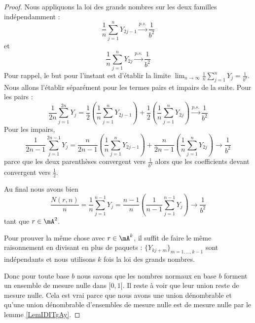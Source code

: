\begin{proof}
    Nous appliquons la loi des grands nombres sur les deux familles indépendamment :
    \begin{equation}
        \frac{1}{ n }\sum_{j=1}^nY_{2j-1}\stackrel{p.s.}{\longrightarrow}\frac{1}{ b^2 }
    \end{equation}
    et 
    \begin{equation}
        \frac{1}{ n }\sum_{j=1}^nY_{2j}\stackrel{p.s.}{\longrightarrow}\frac{1}{ b^2 }
    \end{equation}
    Pour rappel, le but pour l'instant est d'établir la limite \( \lim_{n\to \infty} \frac{1}{ n }\sum_{j=1}^nY_j=\frac{1}{ b^2 }\). Nous allons l'établir séparément pour les termes pairs et impairs de la suite. Pour les pairs :
    \begin{equation}
        \frac{1}{ 2n }\sum_{j=1}^{2n}Y_j=\frac{ 1 }{2}\left( \frac{1}{ n }\sum_{j=1}^nY_{2j-1} \right)+\frac{ 1 }{2}\left( \frac{1}{ n }\sum_{j=1}^nY_{2j} \right)\stackrel{p.s.}{\longrightarrow}\frac{1}{ b^2 }
    \end{equation}
    Pour les impairs,
    \begin{equation}
        \frac{1}{ 2n-1 }\sum_{j=1}^{2n-1}Y_j=\frac{ n }{ 2n-1 }\left( \frac{1}{ n }\sum_{j=1}^nY_{2j-1} \right)+\frac{ n }{ 2n-1 }\left( \frac{1}{ n }\sum_{j=1}^nY_{2j} \right)\to\frac{1}{ b^2 }
    \end{equation}
    parce que les deux parenthèses convergent vers \( \frac{1}{ b^2 }\) alors que les coefficients devant convergent vers \( \frac{ 1 }{2}\).

    Au final nous avons bien
    \begin{equation}
        \frac{ N(r,n) }{ n }=\frac{1}{ n }\sum_{j=1}^{n-1}Y_j=\frac{ n-1 }{ n }\left( \frac{1}{ n-1 }\sum_{j=1}^{n-1}Y_j \right)\to\frac{1}{ b^2 }
    \end{equation}
    tant que \( r\in\mA^2\).

    Pour prouver la même chose avec \( r\in \mA^k\), il suffit de faire le même raisonnement en divisant en plus de paquets : \( \{ Y_{kj+m} \}_{m=1,\ldots, k-1}\) sont indépendants et nous utilisons \( k\) fois la loi des grands nombres.

    Donc pour toute base \( b\) nous savons que les nombres normaux en base \( b\) forment un ensemble de mesure nulle dans \( \mathopen[ 0 , 1 [\). Il reste à voir que leur union reste de mesure nulle. Cela est vrai parce que nous avons une union dénombrable et qu'une union dénombrable d'ensembles de mesure nulle est de mesure nulle par le lemme \ref{LemIDITgAy}.
\end{proof}


